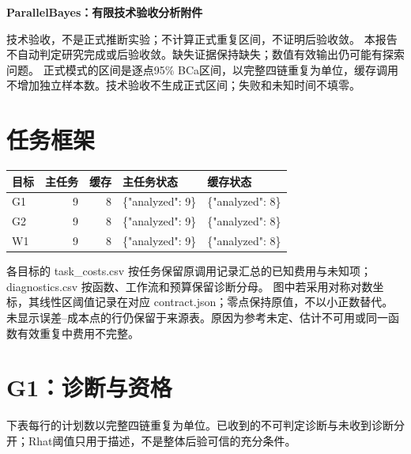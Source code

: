 \documentclass[UTF8,fontset=fandol,a4paper]{ctexart}
\begin{document}
\begin{center}{\Large\bfseries ParallelBayes：有限技术验收分析附件}\end{center}
技术验收，不是正式推断实验；不计算正式重复区间，不证明后验收敛。
本报告不自动判定研究完成或后验收敛。缺失证据保持缺失；数值有效输出仍可能有探索问题。
正式模式的区间是逐点95\% BCa区间，以完整四链重复为单位，缓存调用不增加独立样本数。技术验收不生成正式区间；失败和未知时间不填零。
\section*{任务框架}
\begin{longtable}{lrrp{46mm}p{46mm}}
\toprule 目标 & 主任务 & 缓存 & 主任务状态 & 缓存状态 \\ \midrule\endhead
G1 & 9 & 8 & \{"analyzed": 9\} & \{"analyzed": 8\} \\
G2 & 9 & 8 & \{"analyzed": 9\} & \{"analyzed": 8\} \\
W1 & 9 & 8 & \{"analyzed": 9\} & \{"analyzed": 8\} \\
\bottomrule\end{longtable}
各目标的 task\_costs.csv 按任务保留原调用记录汇总的已知费用与未知项；diagnostics.csv 按函数、工作流和预算保留诊断分母。
图中若采用对称对数坐标，其线性区阈值记录在对应 contract.json；零点保持原值，不以小正数替代。
未显示误差--成本点的行仍保留于来源表。原因为参考未定、估计不可用或同一函数有效重复中费用不完整。
\clearpage\section*{G1：诊断与资格}
下表每行的计划数以完整四链重复为单位。已收到的不可判定诊断与未收到诊断分开；Rhat阈值只用于描述，不是整体后验可信的充分条件。
\end{document}
